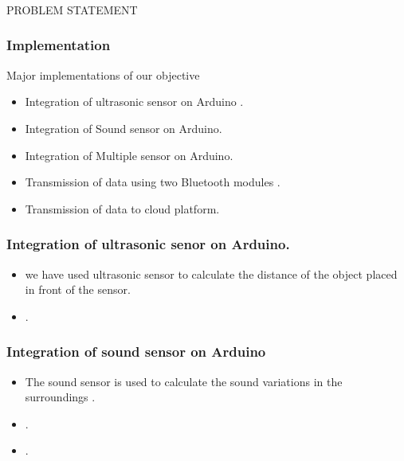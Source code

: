 \documentclass{beamer}
\begin{document}
\begin{frame}\frametitle{}
\Huge
\begin{center}PROBLEM STATEMENT\end{center}
\end{frame}
\begin{frame}\frametitle{Implementation}
\item Major implementations of our objective 
\begin{itemize}

\item Integration of ultrasonic sensor on Arduino .
\item Integration of Sound sensor on Arduino.
\item Integration of Multiple sensor on Arduino.
\item Transmission of data  using two  Bluetooth modules .
\item Transmission of data to cloud platform.

\end{itemize}
\end{frame}
\begin{frame}\frametitle{Integration of ultrasonic senor on Arduino.}
\begin{itemize}
\item we have used ultrasonic sensor to calculate the distance of the object placed in front of the sensor.
\item .
\end{itemize}
\end{frame}

\begin{frame}\frametitle{Integration of sound sensor on Arduino}
\begin{itemize}
\item The sound sensor is used to calculate the  sound variations in the  surroundings  .  
\item   .  
\item   .
\end{itemize}
\end{frame}
\end{document}
